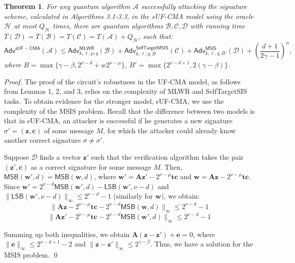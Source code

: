 \documentclass{article}
\theoremstyle{plain}
\newtheorem{theorem}{Theorem}
\theoremstyle{definition}
\begin{document}
    \begin{theorem}
    For any quantum algorithm $\mathcal{A}$ successfully attacking the signature scheme, calculated in Algorithms 3.1-3.3, in the sUF-CMA model using the oracle $\mathcal{H}$ at most $Q_\mathcal{H}$ times, there are quantum algorithms $\mathcal{B}, \mathcal{C}, \mathcal{D}$ with running time $T(\mathcal{D}) = T(\mathcal{B}) = T(\mathcal{C}) = T (\mathcal{A}) + Q_\mathcal{H}$, such that:
    $$
    \mathsf{Adv}^{\mathsf{sUF-CMA}}(\mathcal{A}) \leq \mathsf{Adv}^{\mathsf{MLWR}}_{k, \ell, p, q}(\mathcal{B}) + \mathsf{Adv}^{\mathsf{SelfTargetMSIS}}_{k, \ell, q, B}(\mathcal{C}) + \mathsf{Adv}^{\mathsf{MSIS}}_{k, \ell, q, B'}(\mathcal{D}) + \left(\frac{d + 1}{2 \gamma - 1}\right)^n,
    $$
    where $B = \max\{\gamma - \beta, 2^{\nu - d} + w2^{\nu - \mu}\}$, $B' = \max\{2^{\nu - d + 1}, 2(\gamma - \beta)\}$.
    \end{theorem}

    \emph{Proof.} The proof of the circuit's robustness in the UF-CMA model, as follows from Lemmas 1, 2, and 3, relies on the complexity of MLWR and SelfTargetSIS tasks. To obtain evidence for the stronger model, sUF-CMA, we use the complexity of the MSIS problem. Recall that the difference between two models is that in sUF-CMA, an attacker is successful if he generates a new signature $\sigma' = (\mathbf{z}, \mathbf{c})$ of some message $M$, for which the attacker could already know another correct signature $\sigma \neq \sigma'$.
    
    Suppose $\mathcal{D}$ finds a vector $\mathbf{z}'$ such that the verification algorithm takes the pair $(\mathbf{z}', \mathbf{c})$ as a correct signature for some message $M$. Then, $\mathsf{MSB}(\mathbf{w'}, d) = \mathsf{MSB}(\mathbf{w}, d)$, where $\mathbf{w'} = \mathbf{Az'} - 2^{\nu - \mu} \mathbf{tc}$ and $\mathbf{w} = \mathbf{Az} - 2^{\nu - \mu} \mathbf{tc}$. Since $\mathbf{w}' = 2^{\nu - d} \mathsf{MSB}(\mathbf{w}', d) - \mathsf{LSB}(\mathbf{w}', \nu - d)$ and $\|\mathsf{LSB}(\mathbf{w}', \nu - d)\|_\infty \leq 2^{\nu - d} - 1$ (similarly for $\mathbf{w})$, we obtain:
    $$
    \|\mathbf{Az} - 2^{\nu - \mu} \mathbf{tc} - 2^{\nu - d} \mathsf{MSB}(\mathbf{w}, d)\|_\infty \leq 2^{\nu - d} - 1
    $$
    $$
    \|\mathbf{Az'} - 2^{\nu - \mu} \mathbf{tc} - 2^{\nu - d} \mathsf{MSB}(\mathbf{w'}, d)\|_\infty \leq 2^{\nu - d} - 1
    $$

    Summing up both inequalities, we obtain $\mathbf{A}(\mathbf{z} - \mathbf{z'}) + \mathbf{e} = 0$, where $\|\mathbf{e}\|_\infty \leq 2^{\nu - d + 1} - 2$ and $\|\mathbf{z} - \mathbf{z'}\|_\infty \leq 2^{\gamma - \beta}$. Thus, we have a solution for the MSIS problem. \qed
\end{document}
